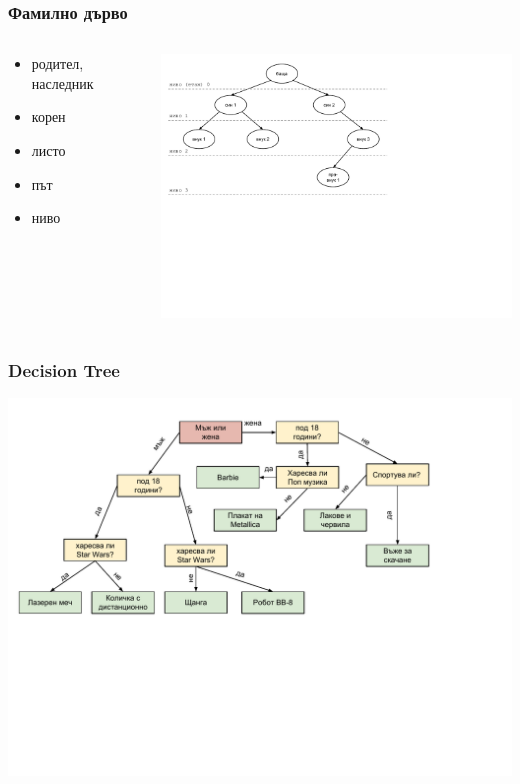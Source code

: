 \documentclass{beamer}
\begin{document}
\begin{frame}[fragile]
\frametitle{Фамилно дърво}

\begin{columns}[t]
  \begin{column}{0.35\textwidth}

    \begin{itemize}
      \item родител, наследник
      \item корен
      \item листо
      \item път
      \item ниво
    \end{itemize}

  \end{column}
  \begin{column}{0.65\textwidth}

\includegraphics[width=10cm]{images/tree_family_tree}

  \end{column}
\end{columns}

\end{frame}


\begin{frame}[fragile]
\frametitle{Decision Tree}

\includegraphics[width=14cm]{images/tree_decision}

\end{frame}
\end{document}
